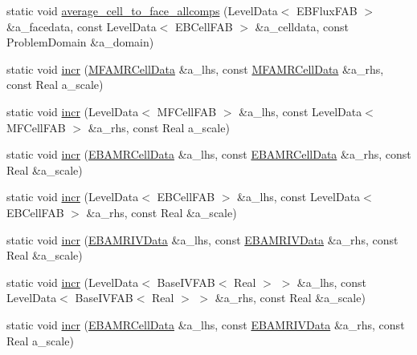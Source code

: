 \begin{DoxyCompactItemize}
\item 
static void \hyperlink{classdata__ops_aca8fc1ffd2743d5ca554fdc69511b5af}{average\+\_\+cell\+\_\+to\+\_\+face\+\_\+allcomps} (Level\+Data$<$ E\+B\+Flux\+F\+AB $>$ \&a\+\_\+facedata, const Level\+Data$<$ E\+B\+Cell\+F\+AB $>$ \&a\+\_\+celldata, const Problem\+Domain \&a\+\_\+domain)
\item 
static void \hyperlink{classdata__ops_abc52e985091e1367bad985c6f91fe2c0}{incr} (\hyperlink{type__definitions_8H_aced885351d40daa466564acbee4042d3}{M\+F\+A\+M\+R\+Cell\+Data} \&a\+\_\+lhs, const \hyperlink{type__definitions_8H_aced885351d40daa466564acbee4042d3}{M\+F\+A\+M\+R\+Cell\+Data} \&a\+\_\+rhs, const Real a\+\_\+scale)
\item 
static void \hyperlink{classdata__ops_a186aa04adc46ca5c658df38673d16435}{incr} (Level\+Data$<$ M\+F\+Cell\+F\+AB $>$ \&a\+\_\+lhs, const Level\+Data$<$ M\+F\+Cell\+F\+AB $>$ \&a\+\_\+rhs, const Real a\+\_\+scale)
\item 
static void \hyperlink{classdata__ops_a1e9426752cdce78013bea784a448ccf0}{incr} (\hyperlink{type__definitions_8H_a7e610f301989e5e07781c5e338bdb7c3}{E\+B\+A\+M\+R\+Cell\+Data} \&a\+\_\+lhs, const \hyperlink{type__definitions_8H_a7e610f301989e5e07781c5e338bdb7c3}{E\+B\+A\+M\+R\+Cell\+Data} \&a\+\_\+rhs, const Real \&a\+\_\+scale)
\item 
static void \hyperlink{classdata__ops_a1575465afa3658d3c345b60d3243b683}{incr} (Level\+Data$<$ E\+B\+Cell\+F\+AB $>$ \&a\+\_\+lhs, const Level\+Data$<$ E\+B\+Cell\+F\+AB $>$ \&a\+\_\+rhs, const Real \&a\+\_\+scale)
\item 
static void \hyperlink{classdata__ops_ab0e96799f9f23cc8d322dac2bb18ee84}{incr} (\hyperlink{type__definitions_8H_a6b8fa905d55cbb491b52180386f0e0c1}{E\+B\+A\+M\+R\+I\+V\+Data} \&a\+\_\+lhs, const \hyperlink{type__definitions_8H_a6b8fa905d55cbb491b52180386f0e0c1}{E\+B\+A\+M\+R\+I\+V\+Data} \&a\+\_\+rhs, const Real \&a\+\_\+scale)
\item 
static void \hyperlink{classdata__ops_abe9ce22c0b54a40484e603763d01a79b}{incr} (Level\+Data$<$ Base\+I\+V\+F\+AB$<$ Real $>$ $>$ \&a\+\_\+lhs, const Level\+Data$<$ Base\+I\+V\+F\+AB$<$ Real $>$ $>$ \&a\+\_\+rhs, const Real \&a\+\_\+scale)
\item 
static void \hyperlink{classdata__ops_a07c42cfeae7266389b83183915c88cf7}{incr} (\hyperlink{type__definitions_8H_a7e610f301989e5e07781c5e338bdb7c3}{E\+B\+A\+M\+R\+Cell\+Data} \&a\+\_\+lhs, const \hyperlink{type__definitions_8H_a6b8fa905d55cbb491b52180386f0e0c1}{E\+B\+A\+M\+R\+I\+V\+Data} \&a\+\_\+rhs, const Real a\+\_\+scale)

\end{DoxyCompactItemize}

